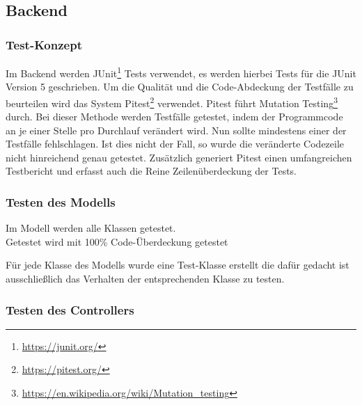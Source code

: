 \subsection{Backend}
\subsubsection{Test-Konzept}
Im Backend werden JUnit\footnote{\url{https://junit.org/}} Tests verwendet, es werden hierbei Tests für die JUnit Version 5 geschrieben.
Um die Qualität und die Code-Abdeckung der Testfälle zu beurteilen wird das System Pitest\footnote{\url{https://pitest.org/}} verwendet.
Pitest führt Mutation Testing\footnote{\url{https://en.wikipedia.org/wiki/Mutation_testing}} durch.
Bei dieser Methode werden Testfälle getestet, indem der Programmcode an je einer Stelle pro Durchlauf verändert wird.
Nun sollte mindestens einer der Testfälle fehlschlagen.
Ist dies nicht der Fall, so wurde die veränderte Codezeile nicht hinreichend genau getestet.
Zusätzlich generiert Pitest einen umfangreichen Testbericht und erfasst auch die Reine Zeilenüberdeckung der Tests.

\subsubsection{Testen des Modells}
Im Modell werden alle Klassen getestet.
\\
Getestet wird mit 100\% Code-Überdeckung getestet

Für jede Klasse des Modells wurde eine Test-Klasse erstellt die dafür gedacht ist ausschließlich das Verhalten der entsprechenden Klasse zu testen.

\subsubsection{Testen des Controllers}

